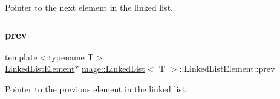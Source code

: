 Pointer to the next element in the linked list. \hypertarget{structmage_1_1_linked_list_1_1_linked_list_element_a6aa1a290fa0c06efae90730220bb4c57}{}\label{structmage_1_1_linked_list_1_1_linked_list_element_a6aa1a290fa0c06efae90730220bb4c57} 
\subsubsection{\texorpdfstring{prev}{prev}}
{\footnotesize\ttfamily template$<$typename T$>$ \\
\hyperlink{structmage_1_1_linked_list_1_1_linked_list_element}{Linked\+List\+Element}$\ast$ \hyperlink{classmage_1_1_linked_list}{mage\+::\+Linked\+List}$<$ T $>$\+::Linked\+List\+Element\+::prev}

Pointer to the previous element in the linked list. 